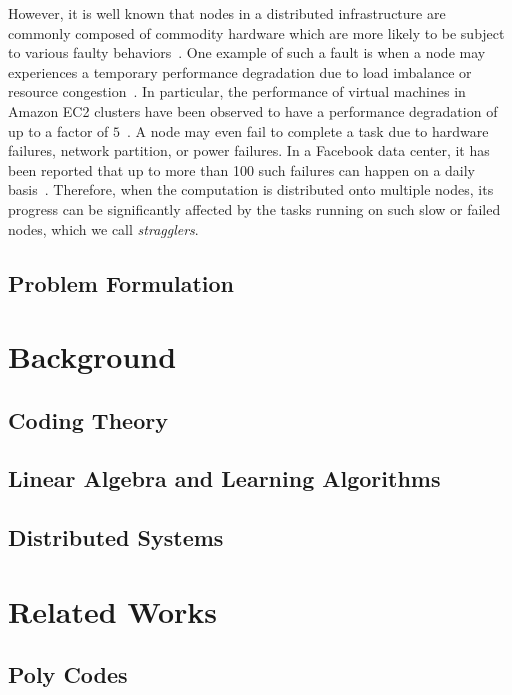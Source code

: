 \documentclass{report}
\begin{document}
However, it is well known that nodes in a distributed infrastructure are commonly composed of commodity hardware which are more likely to be subject to various faulty behaviors~\cite{Huang2017a}. 
One example of such a fault is when a node may experiences a temporary performance degradation due to load imbalance or resource congestion~\cite{Lee2018a}. 
In particular, the performance of virtual machines in Amazon EC2 clusters have been observed to have a performance degradation of up to a factor of $5$~\cite{Tandon2017, Lee2018a}. 
A node may even fail to complete a task due to hardware failures, network partition, or power failures. 
In a Facebook data center, it has been reported that up to more than 100 such failures can happen on a daily basis~\cite{Rashmi2013,Sathiamoorthy2013}.
Therefore, when the computation is distributed onto multiple nodes, its progress can be significantly affected by the tasks running on such slow or failed
nodes, which we call {\em stragglers}.

\subsection{Problem Formulation}


\section{Background}

\subsection{Coding Theory}

\subsection{Linear Algebra and Learning Algorithms}

\subsection{Distributed Systems}


\section{Related Works}

\subsection{Poly Codes}
\end{document}
